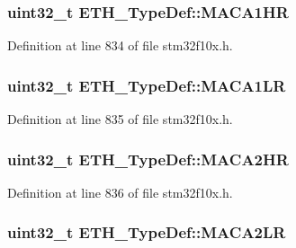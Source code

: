 \subsubsection[{\texorpdfstring{M\+A\+C\+A1\+HR}{MACA1HR}}]{ {\bf uint32\+\_\+t} E\+T\+H\+\_\+\+Type\+Def\+::\+M\+A\+C\+A1\+HR}\hypertarget{struct_e_t_h___type_def_a8f7f8cbf64bf3ce73a6d25ca019ca712}{}\label{struct_e_t_h___type_def_a8f7f8cbf64bf3ce73a6d25ca019ca712}


Definition at line 834 of file stm32f10x.\+h.

\subsubsection[{\texorpdfstring{M\+A\+C\+A1\+LR}{MACA1LR}}]{ {\bf uint32\+\_\+t} E\+T\+H\+\_\+\+Type\+Def\+::\+M\+A\+C\+A1\+LR}\hypertarget{struct_e_t_h___type_def_ad0b7882917068bd398d4d8e209794ead}{}\label{struct_e_t_h___type_def_ad0b7882917068bd398d4d8e209794ead}


Definition at line 835 of file stm32f10x.\+h.

\subsubsection[{\texorpdfstring{M\+A\+C\+A2\+HR}{MACA2HR}}]{ {\bf uint32\+\_\+t} E\+T\+H\+\_\+\+Type\+Def\+::\+M\+A\+C\+A2\+HR}\hypertarget{struct_e_t_h___type_def_a1ad00033d223abb9075df5bf38894445}{}\label{struct_e_t_h___type_def_a1ad00033d223abb9075df5bf38894445}


Definition at line 836 of file stm32f10x.\+h.

\subsubsection[{\texorpdfstring{M\+A\+C\+A2\+LR}{MACA2LR}}]{ {\bf uint32\+\_\+t} E\+T\+H\+\_\+\+Type\+Def\+::\+M\+A\+C\+A2\+LR}\hypertarget{struct_e_t_h___type_def_ae9332525bb7ec86518eecf7153caef19}{}\label{struct_e_t_h___type_def_ae9332525bb7ec86518eecf7153caef19}


